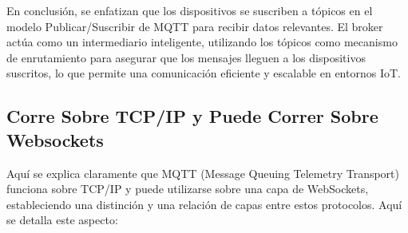 \documentclass{report}
\begin{document}
En conclusión, se  enfatizan que los dispositivos se suscriben a tópicos en el modelo Publicar/Suscribir de MQTT 
para recibir datos relevantes. El broker actúa como un intermediario inteligente, utilizando los tópicos como mecanismo de 
enrutamiento para asegurar que los mensajes lleguen a los dispositivos suscritos, lo que permite una comunicación eficiente 
y escalable en entornos IoT.

\subsection{Corre Sobre TCP/IP y Puede Correr Sobre Websockets}
Aquí se explica claramente que MQTT (Message Queuing Telemetry Transport) funciona sobre TCP/IP y puede 
utilizarse sobre una capa de WebSockets, estableciendo una distinción y una relación de capas entre estos protocolos.
Aquí se detalla este aspecto:
\end{document}
